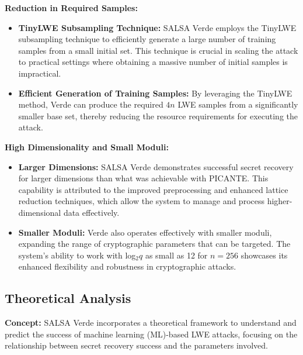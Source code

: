 \documentclass{article}
\begin{document}
\vspace{3mm}

\textbf{Reduction in Required Samples:}
\begin{itemize}
    \item \textbf{TinyLWE Subsampling Technique:} SALSA Verde employs the TinyLWE subsampling technique to efficiently generate a large number of training samples from a small initial set. This technique is crucial in scaling the attack to practical settings where obtaining a massive number of initial samples is impractical.
    \item \textbf{Efficient Generation of Training Samples:} By leveraging the TinyLWE method, Verde can produce the required \( 4n \) LWE samples from a significantly smaller base set, thereby reducing the resource requirements for executing the attack.
\end{itemize}

\textbf{High Dimensionality and Small Moduli:}
\begin{itemize}
    \item \textbf{Larger Dimensions:} SALSA Verde demonstrates successful secret recovery for larger dimensions than what was achievable with PICANTE. This capability is attributed to the improved preprocessing and enhanced lattice reduction techniques, which allow the system to manage and process higher-dimensional data effectively.
    \item \textbf{Smaller Moduli:} Verde also operates effectively with smaller moduli, expanding the range of cryptographic parameters that can be targeted. The system's ability to work with log\(_2 q\) as small as 12 for \( n = 256 \) showcases its enhanced flexibility and robustness in cryptographic attacks.
\end{itemize}

\subsection{Theoretical Analysis}

\textbf{Concept:} SALSA Verde incorporates a theoretical framework to understand and predict the success of machine learning (ML)-based LWE attacks, focusing on the relationship between secret recovery success and the parameters involved.

\vspace{3mm}
\end{document}
